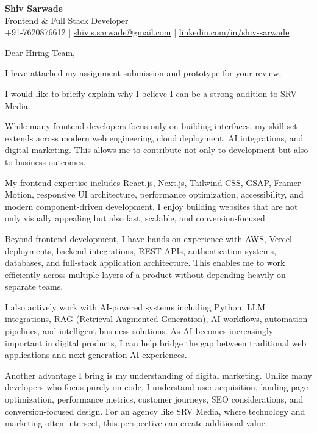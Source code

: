 \documentclass[11pt,a4paper]{letter}
\newcommand{\mypar}{\vspace{1em}\noindent}
\begin{document}
\begin{flushleft}
\textbf{\Large Shiv Sarwade}\\[0.5em]
Frontend \& Full Stack Developer\\[0.5em]
+91-7620876612 | \href{mailto:shiv.s.sarwade@gmail.com}{shiv.s.sarwade@gmail.com} | \href{https://linkedin.com/in/shiv-sarwade}{linkedin.com/in/shiv-sarwade}
\vspace{2em}

Dear Hiring Team,\mypar

I have attached my assignment submission and prototype for your review.\mypar

I would like to briefly explain why I believe I can be a strong addition to SRV Media.\mypar

While many frontend developers focus only on building interfaces, my skill set extends across modern web engineering, cloud deployment, AI integrations, and digital marketing. This allows me to contribute not only to development but also to business outcomes.\mypar

My frontend expertise includes React.js, Next.js, Tailwind CSS, GSAP, Framer Motion, responsive UI architecture, performance optimization, accessibility, and modern component-driven development. I enjoy building websites that are not only visually appealing but also fast, scalable, and conversion-focused.\mypar

Beyond frontend development, I have hands-on experience with AWS, Vercel deployments, backend integrations, REST APIs, authentication systems, databases, and full-stack application architecture. This enables me to work efficiently across multiple layers of a product without depending heavily on separate teams.\mypar

I also actively work with AI-powered systems including Python, LLM integrations, RAG (Retrieval-Augmented Generation), AI workflows, automation pipelines, and intelligent business solutions. As AI becomes increasingly important in digital products, I can help bridge the gap between traditional web applications and next-generation AI experiences.\mypar

Another advantage I bring is my understanding of digital marketing. Unlike many developers who focus purely on code, I understand user acquisition, landing page optimization, performance metrics, customer journeys, SEO considerations, and conversion-focused design. For an agency like SRV Media, where technology and marketing often intersect, this perspective can create additional value.\mypar


\end{flushleft}
\end{document}
